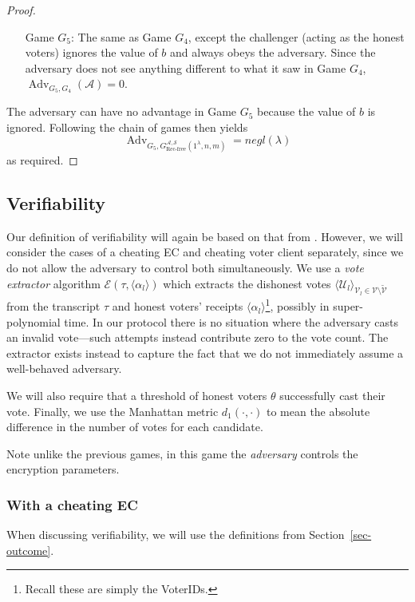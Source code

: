 \documentclass[12pt,a4paper]{article}
\DeclareMathOperator{\Adv}{\text{Adv}}
\theoremstyle{definition}
\begin{document}
\begin{proof}
\begin{itemize}[leftmargin=4em]
        \item[Game] $G_5$: The same as Game $G_4$, except the challenger (acting as the honest voters) ignores the value of $b$ and always obeys the adversary. Since the adversary does not see anything different to what it saw in Game $G_4$, $\Adv_{G_5, G_4}(\mathcal{A})=0$.
    \end{itemize}
    The adversary can have no advantage in Game $G_5$ because the value of $b$ is ignored. Following the chain of games then yields
        $$\Adv_{G_5, G^{\mathcal{A},\mathcal{S}}_\text{Rec-free}(1^\lambda,n,m)}=negl(\lambda)$$
    as required.
\end{proof}
\subsection{Verifiability}
Our definition of verifiability will again be based on that from \cite{kiayias2015end}. However, we will consider the cases of a cheating EC and cheating voter client separately, since we do not allow the adversary to control both simultaneously.
We use a \textit{vote extractor} algorithm $\mathcal{E}\left(\tau, \langle \alpha_l \rangle\right)$ which extracts the dishonest votes $\langle \mathcal{U}_l \rangle_{\mathcal{V}_l\in\mathcal{V}\setminus\tilde{\mathcal{V}}}$ from the transcript $\tau$ and honest voters' receipts $\langle \alpha_l \rangle$\footnote{Recall these are simply the VoterIDs.}, possibly in super-polynomial time. In our protocol there is no situation where the adversary casts an invalid vote---such attempts instead contribute zero to the vote count. The extractor exists instead to capture the fact that we do not immediately assume a well-behaved adversary.

We will also require that a threshold of honest voters $\theta$ successfully cast their vote. Finally, we use the Manhattan metric $d_1(\cdot, \cdot)$ to mean the absolute difference in the number of votes for each candidate.

Note unlike the previous games, in this game the \textit{adversary} controls the encryption parameters.

\subsubsection{With a cheating EC}
When discussing verifiability, we will use the definitions from Section~\ref{sec-outcome}.
\end{document}
